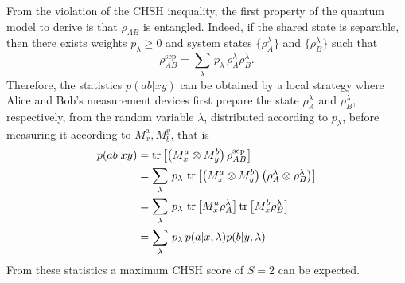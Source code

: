 From the violation of the CHSH inequality, the first property of the quantum model to derive is that $\rho_{AB}$ is entangled.
Indeed, if the shared state is separable, then there exists weights $p_\lambda\geq 0$ and system states $\{\rho_{A}^\lambda\}$ and $\{\rho_{B}^\lambda\}$ such that
\begin{equation}
	\rho_{AB}^\text{sep} = \sum_\lambda\, p_\lambda\, \rho_{A}^\lambda \rho_B^\lambda.
\end{equation}
Therefore, the statistics $p(ab|xy)$ can be obtained by a local strategy where Alice and Bob's measurement devices first prepare the state $\rho_A^\lambda$ and $\rho_B^\lambda$, respectively, from the random variable $\lambda$, distributed according to $p_\lambda$, before measuring it according to $M^a_x,M_b^y$, that is
\begin{equation}
	\begin{split}
		p(ab|xy) &= \trr{\left(M^a_x \otimes M^b_y \right) \rho_{AB}^\text{sep}}  \\
				 & = \sum_\lambda\, p_\lambda \, \trr{\left(M^a_x \otimes M^b_y \right)\left(\rho_{A}^\lambda \otimes \rho_B^\lambda\right)} \\
				 & = \sum_\lambda\, p_\lambda\, \trr{M^a_x \rho_A^\lambda} \trr{M^b_x \rho_B^\lambda} \\
				 & = \sum_\lambda\, p_\lambda\, p(a|x,\lambda) p(b|y,\lambda)
	\end{split}
\end{equation}
From these statistics a maximum CHSH score of $S=2$ can be expected.

\medbreak

